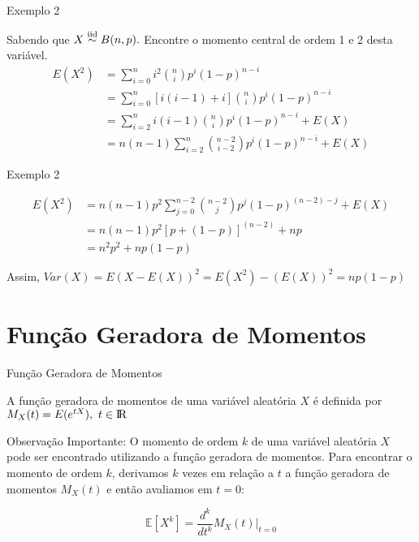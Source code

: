 \documentclass[12pt]{beamer}
\begin{document}
\begin{frame}{Exemplo 2}
	\begin{block}{}
		\justifying
		Sabendo que $X\overset{\text{iid}}{\sim} B(n,p).$ Encontre o momento central de ordem 1 e 2 desta variável.
		\begin{align*}
			E(X^{2})&={\displaystyle \sum_{i=0}^{n}i^{2}\binom{n}{i}p^{i}(1-p)^{n-i}}\\
			&={\displaystyle \sum_{i=0}^{n}[i(i-1)+i]\binom{n}{i}p^{i}(1-p)^{n-i}}\\
			&={\displaystyle \sum_{i=2}^{n}i(i-1)\binom{n}{i}p^{i}(1-p)^{n-i}}+E(X)\\
			&={\displaystyle n(n-1)\sum_{i=2}^{n}\binom{n-2}{i-2}p^{i}(1-p)^{n-i}}+E(X)
		\end{align*}
	\end{block}
\end{frame}

\begin{frame}{Exemplo 2}
	\begin{block}{}
		\justifying
		\begin{align*}
			E(X^{2})&={\displaystyle n(n-1)p^{2}\sum_{j=0}^{n-2}\binom{n-2}{j}p^{j}(1-p)^{(n-2)-j}}+E(X)\\
			&=n(n-1)p^{2}[p+(1-p)]^{(n-2)}+np\\
			&=n^{2}p^{2}+np(1-p)
		\end{align*}
	\end{block}
	\pause
	\begin{block}{}
		\justifying
		Assim, $Var(X)=E{(X-E(X))^{2}}=E(X^{2})-(E(X))^{2}=np(1-p)$
	\end{block}
\end{frame}

\section{Função Geradora de Momentos}
\begin{frame}{Função Geradora de Momentos}
	\begin{definicao}
		\justifying
		A função geradora de momentos de uma variável aleatória $X$ é definida por $M_{X}(t)=E(e^{tX}),~t\in \rm I\!R$
	\end{definicao}
	\pause
	\begin{block}{Observação Importante:}
		\justifying
		O momento de ordem \( k \) de uma variável aleatória \( X \) pode ser encontrado utilizando a função geradora de momentos. Para encontrar o momento de ordem \( k \), derivamos \( k \) vezes em relação a \( t \) a função geradora de momentos \( M_X(t) \) e então avaliamos em \( t = 0 \):
		
		\[
		\mathbb{E}[X^k] = \frac{d^k}{dt^k} M_X(t) \bigg|_{t=0}
		\]
	\end{block}
\end{frame}
\end{document}
